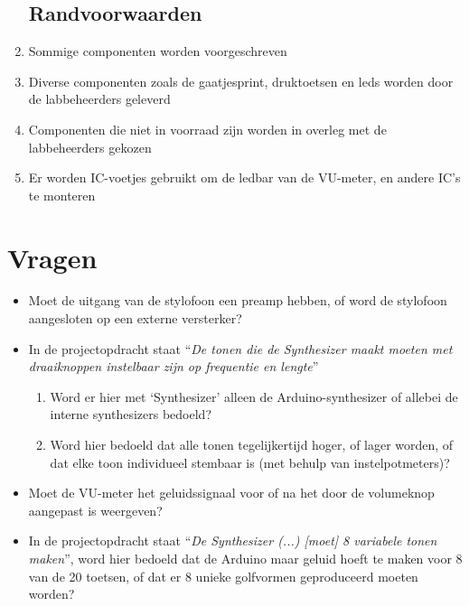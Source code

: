 \documentclass[12pt, a4paper, dutch]{article}
\begin{document}
\begin{enumerate}
\subsection{Randvoorwaarden}
	\item Sommige componenten worden voorgeschreven
	\item Diverse componenten zoals de gaatjesprint, druktoetsen en leds worden door de
		labbeheerders geleverd
	\item Componenten die niet in voorraad zijn worden in overleg met de labbeheerders
		gekozen
	\item Er worden IC-voetjes gebruikt om de ledbar van de VU-meter, en andere IC's te
		monteren
\end{enumerate}

\section{Vragen}

\begin{itemize}
	\item Moet de uitgang van de stylofoon een preamp hebben, of word de stylofoon
		aangesloten op een externe versterker?
	\item In de projectopdracht staat ``\emph{De tonen die de Synthesizer maakt moeten
		met draaiknoppen instelbaar zijn op frequentie en lengte}''
	\begin{enumerate}
		\item Word er hier met `Synthesizer' alleen de Arduino-synthesizer of allebei de
			interne synthesizers bedoeld?
		\item Word hier bedoeld dat alle tonen tegelijkertijd hoger, of lager worden, of
			dat elke toon individueel stembaar is (met behulp van instelpotmeters)?
	\end{enumerate}
	\item Moet de VU-meter het geluidssignaal voor of na het door de volumeknop
		aangepast is weergeven?
	\item In de projectopdracht staat ``\emph{De Synthesizer (...) [moet] 8 variabele
		tonen maken}'', word hier bedoeld dat de Arduino maar geluid hoeft te maken voor
		8 van de 20 toetsen, of dat er 8 unieke golfvormen geproduceerd moeten worden?
\end{itemize}
\end{document}
